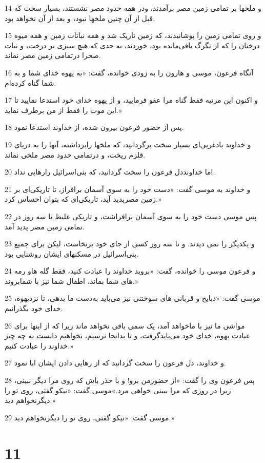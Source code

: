 \par 14 و ملخها بر تمامی زمین مصر برآمدند، ودر همه حدود مصر نشستند، بسیار سخت که قبل از آن چنین ملخها نبود، و بعد از آن نخواهد بود.
\par 15 و روی تمامی زمین را پوشانیدند، که زمین تاریک شد و همه نباتات زمین و همه میوه درختان را که از تگرگ باقی‌مانده بود، خوردند، به حدی که هیچ سبزی بر درخت، و نبات صحرا درتمامی زمین مصر نماند.
\par 16 آنگاه فرعون، موسی و هارون را به زودی خوانده، گفت: «به یهوه خدای شما و به شما گناه کرده‌ام.
\par 17 و اکنون این مرتبه فقط گناه مرا عفو فرمایید، و از یهوه خدای خود استدعا نمایید تا این موت را فقط از من برطرف نماید.»
\par 18 پس از حضور فرعون بیرون شده، از خداوند استدعا نمود.
\par 19 و خداوند بادغربی‌ای بسیار سخت برگردانید، که ملخها رابرداشته، آنها را به دریای قلزم ریخت، و درتمامی حدود مصر ملخی نماند.
\par 20 اما خداونددل فرعون را سخت گردانید، که بنی‌اسرائیل رارهایی نداد.
\par 21 و خداوند به موسی گفت: «دست خود را به سوی آسمان برافراز، تا تاریکی‌ای بر زمین مصرپدید آید، تاریکی‌ای که بتوان احساس کرد.»
\par 22 پس موسی دست خود را به سوی آسمان برافراشت، و تاریکی غلیظ تا سه روز در تمامی زمین مصر پدید آمد.
\par 23 و یکدیگر را نمی دیدند. و تا سه روز کسی از جای خود برنخاست، لیکن برای جمیع بنی‌اسرائیل در مسکنهای ایشان روشنایی بود.
\par 24 و فرعون موسی را خوانده، گفت: «بروید خداوند را عبادت کنید، فقط گله هاو رمه های شما بماند، اطفال شما نیز با شمابروند.»
\par 25 موسی گفت: «ذبایح و قربانی های سوختنی نیز می‌باید به‌دست ما بدهی، تا نزدیهوه، خدای خود بگذرانیم.
\par 26 مواشی ما نیز با ماخواهد آمد، یک سمی باقی نخواهد ماند زیرا که از اینها برای عبادت یهوه، خدای خود می‌بایدگرفت، و تا بدانجا نرسیم، نخواهیم دانست به چه چیز خداوند را عبادت کنیم.»
\par 27 و خداوند، دل فرعون را سخت گردانید که از رهایی دادن ایشان ابا نمود.
\par 28 پس فرعون وی را گفت: «از حضورمن برو! و با حذر باش که روی مرا دیگر نبینی، زیرا در روزی که مرا ببینی خواهی مرد.»موسی گفت: «نیکو گفتی، روی تو را دیگرنخواهم دید.»
\par 29 موسی گفت: «نیکو گفتی، روی تو را دیگرنخواهم دید.»
 
\chapter{11}

